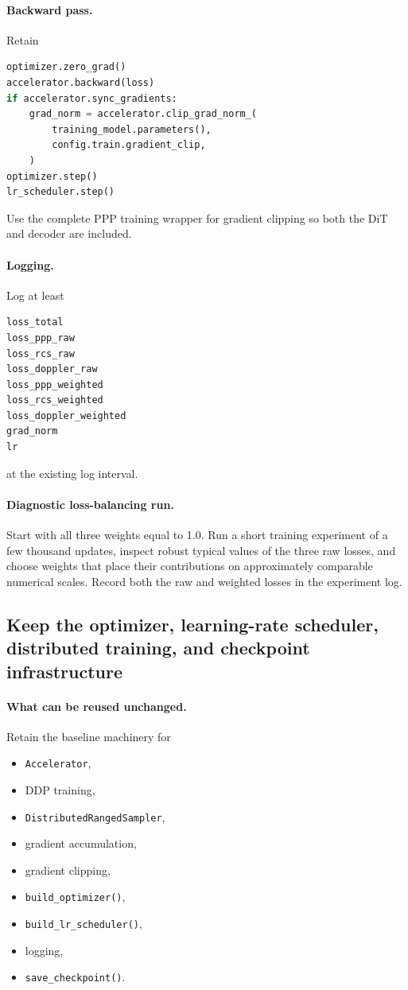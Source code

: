 \documentclass[11pt,a4paper]{article}
\begin{document}
\paragraph{Backward pass.}
Retain
\begin{lstlisting}[language=Python]
optimizer.zero_grad()
accelerator.backward(loss)
if accelerator.sync_gradients:
    grad_norm = accelerator.clip_grad_norm_(
        training_model.parameters(),
        config.train.gradient_clip,
    )
optimizer.step()
lr_scheduler.step()
\end{lstlisting}

Use the complete PPP training wrapper for gradient clipping so both the DiT and decoder are included.

\paragraph{Logging.}
Log at least
\begin{lstlisting}
loss_total
loss_ppp_raw
loss_rcs_raw
loss_doppler_raw
loss_ppp_weighted
loss_rcs_weighted
loss_doppler_weighted
grad_norm
lr
\end{lstlisting}
at the existing log interval.

\paragraph{Diagnostic loss-balancing run.}
Start with all three weights equal to 1.0. Run a short training experiment of a few thousand updates, inspect robust typical values of the three raw losses, and choose weights that place their contributions on approximately comparable numerical scales. Record both the raw and weighted losses in the experiment log.

\subsection{Keep the optimizer, learning-rate scheduler, distributed training, and checkpoint infrastructure}

\paragraph{What can be reused unchanged.}
Retain the baseline machinery for
\begin{itemize}
    \item \texttt{Accelerator},
    \item DDP training,
    \item \texttt{DistributedRangedSampler},
    \item gradient accumulation,
    \item gradient clipping,
    \item \texttt{build\_optimizer()},
    \item \texttt{build\_lr\_scheduler()},
    \item logging,
    \item \texttt{save\_checkpoint()}.
\end{itemize}
\end{document}
